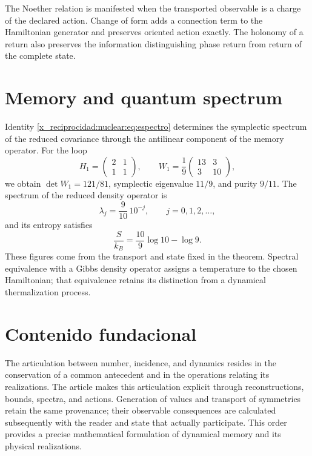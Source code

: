 The Noether relation is manifested when the transported observable is a charge of the declared action. Change of form adds a connection term to the Hamiltonian generator and preserves oriented action exactly. The holonomy of a return also preserves the information distinguishing phase return from return of the complete state.

\section{Memory and quantum spectrum}
Identity \eqref{x_reciprocidad:nuclear:eq:espectro} determines the symplectic spectrum of the reduced covariance through the antilinear component of the memory operator. For the loop
\[
H_1=\begin{pmatrix}2&1\\1&1\end{pmatrix},
\qquad
W_1=\frac19\begin{pmatrix}13&3\\3&10\end{pmatrix},
\]
we obtain \(\det W_1=121/81\), symplectic eigenvalue \(11/9\), and purity \(9/11\). The spectrum of the reduced density operator is
\[
\lambda_j=\frac9{10}\,10^{-j},\qquad j=0,1,2,\ldots,
\]
and its entropy satisfies
\[
\frac{S}{k_B}=\frac{10}{9}\log10-\log9.
\]
These figures come from the transport and state fixed in the theorem. Spectral equivalence with a Gibbs density operator assigns a temperature to the chosen Hamiltonian; that equivalence retains its distinction from a dynamical thermalization process.

\section{Contenido fundacional}
The articulation between number, incidence, and dynamics resides in the conservation of a common antecedent and in the operations relating its realizations. The article makes this articulation explicit through reconstructions, bounds, spectra, and actions. Generation of values and transport of symmetries retain the same provenance; their observable consequences are calculated subsequently with the reader and state that actually participate. This order provides a precise mathematical formulation of dynamical memory and its physical realizations.
